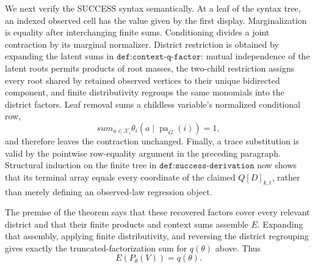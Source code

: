 We next verify the SUCCESS syntax semantically. At a leaf of the syntax tree, an indexed observed cell has the value given by the first display. Marginalization is equality after interchanging finite sums. Conditioning divides a joint contraction by its marginal normalizer. District restriction is obtained by expanding the latent sums in \(\texttt{def:context-q-factor}\): mutual independence of the latent roots permits products of root masses, the two-child restriction assigns every root shared by retained observed vertices to their unique bidirected component, and finite distributivity regroups the same monomials into the district factors. Leaf removal sums a childless variable's normalized conditional row,
\[
 sum_{a\in\mathcal X_i}\theta_i(a\mid\operatorname{pa}_G(i))=1,
\]
and therefore leaves the contraction unchanged. Finally, a trace substitution is valid by the pointwise row-equality argument in the preceding paragraph. Structural induction on the finite tree in \(\texttt{def:success-derivation}\) now shows that its terminal array equals every coordinate of the claimed \(Q[D]_{k,t}\), rather than merely defining an observed-law regression object.

The premise of the theorem says that these recovered factors cover every relevant district and that their finite products and context sums assemble \(E\). Expanding that assembly, applying finite distributivity, and reversing the district regrouping gives exactly the truncated-factorization sum for \(q(\theta)\) above. Thus
\[
 E(P_\theta(V))=q(\theta).
\]

